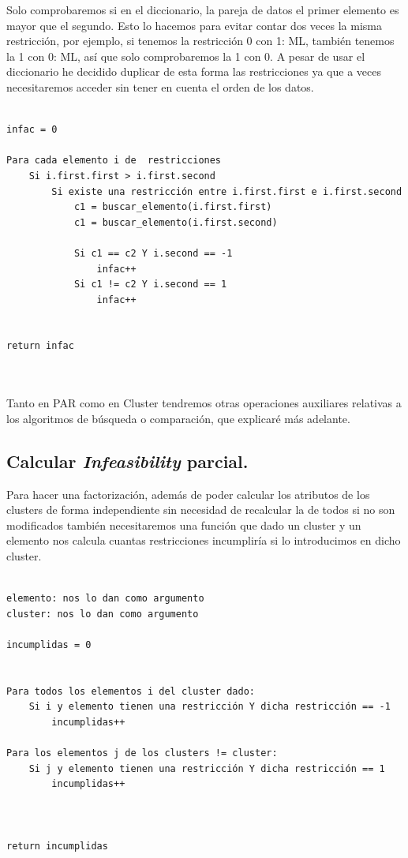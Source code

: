 \documentclass[12pt, spanish]{article}
\begin{document}
Solo comprobaremos si en el diccionario, la pareja de datos el primer elemento es mayor que el segundo. Esto lo hacemos para evitar contar dos veces la misma restricción, por ejemplo, si tenemos la restricción 0 con 1: ML, también tenemos la 1 con 0: ML, así que solo comprobaremos la 1 con 0. A pesar de usar el diccionario he decidido duplicar de esta forma las restricciones ya que a veces necesitaremos acceder sin tener en cuenta el orden de los datos.

\begin{lstlisting}

infac = 0

Para cada elemento i de  restricciones
	Si i.first.first > i.first.second
		Si existe una restricción entre i.first.first e i.first.second
			c1 = buscar_elemento(i.first.first)
			c1 = buscar_elemento(i.first.second)
			
			Si c1 == c2 Y i.second == -1
				infac++
			Si c1 != c2 Y i.second == 1
				infac++
		
		
return infac
	
	
\end{lstlisting}




Tanto en PAR como en Cluster tendremos otras operaciones auxiliares relativas a los algoritmos de búsqueda o comparación, que explicaré más adelante.


\subsection{Calcular \textit{Infeasibility} parcial.}

Para hacer una factorización, además de poder calcular los atributos de los clusters de forma independiente sin necesidad de recalcular la de todos si no son modificados también necesitaremos una función que dado un cluster y un elemento nos calcula cuantas restricciones incumpliría si lo introducimos en dicho cluster.


\begin{lstlisting}

elemento: nos lo dan como argumento
cluster: nos lo dan como argumento

incumplidas = 0


Para todos los elementos i del cluster dado:
	Si i y elemento tienen una restricción Y dicha restricción == -1
		incumplidas++

Para los elementos j de los clusters != cluster:
	Si j y elemento tienen una restricción Y dicha restricción == 1
		incumplidas++



return incumplidas
	
	
\end{lstlisting}
\end{document}
